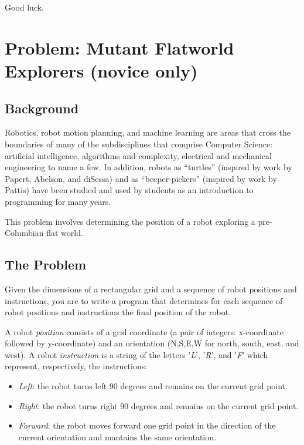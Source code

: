 Good luck.


\clearpage

\section{Problem: Mutant Flatworld Explorers (novice only)}

\subsection*{Background}

Robotics, robot motion planning, and machine learning are areas that
cross the boundaries of many of the subdisciplines that comprise
Computer Science: artificial intelligence, algorithms and complexity,
electrical and mechanical engineering to name a few.  In addition,
robots as ``turtles'' (inspired by work by Papert, Abelson,
and diSessa) and as ``beeper-pickers'' (inspired by work by Pattis) have
been studied and used by students as an introduction to programming for
many years.

This problem involves determining the position of a robot exploring a
pre-Columbian flat world.

\subsection*{The Problem}
Given the dimensions of a rectangular grid and a sequence of robot
positions and instructions, you are to write a program that determines
for each sequence of robot positions and instructions the final position
of the robot.  

A robot {\em position} consists of a grid coordinate (a pair of
integers: x-coordinate followed by y-coordinate) and an orientation
(N,S,E,W for north, south, east, and west).  A robot {\em instruction}
is a string of the letters '{\em L}', '{\em R}', and '{\em F}' which
represent, respectively, the instructions:
\begin{itemize}
\item {\em Left}: the robot turns left 90 degrees and remains on the
current grid point.
\item {\em Right}: the robot turns right 90 degrees and remains on the
current grid point.
\item {\em Forward}: the robot moves forward one grid point in the
direction of the current orientation and mantains the same orientation.
\end{itemize}

